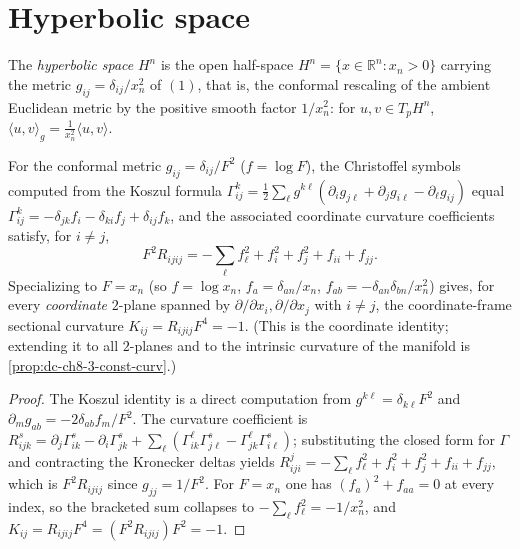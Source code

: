 \section{Hyperbolic space}

\begin{definition}
  \label{def:dc-ch8-3-hyperbolic-space}
  \leanok
  The \emph{hyperbolic space} $H^n$ is the open half-space
  $H^n=\{x\in\mathbb R^n : x_n>0\}$ carrying the metric $g_{ij}=\delta_{ij}/x_n^2$
  of $(1)$, that is, the conformal rescaling of the ambient Euclidean metric by
  the positive smooth factor $1/x_n^2$: for $u,v\in T_pH^n$,
  $\langle u,v\rangle_g=\tfrac{1}{x_n^2}\langle u,v\rangle$.
\end{definition}

\begin{lemma}
  \label{lem:dc-ch8-3-conformal-curvature}
  \leanok
  For the conformal metric $g_{ij}=\delta_{ij}/F^2$ ($f=\log F$), the Christoffel
  symbols computed from the Koszul formula
  $\Gamma^k_{ij}=\tfrac12\sum_\ell g^{k\ell}(\partial_i g_{j\ell}+\partial_j g_{i\ell}-\partial_\ell g_{ij})$
  equal $\Gamma^k_{ij}=-\delta_{jk}f_i-\delta_{ki}f_j+\delta_{ij}f_k$, and the
  associated coordinate curvature coefficients satisfy, for $i\neq j$,
  $$F^2R_{ijij}=-\sum_\ell f_\ell^2+f_i^2+f_j^2+f_{ii}+f_{jj}.$$
  Specializing to $F=x_n$ (so $f=\log x_n$, $f_a=\delta_{an}/x_n$,
  $f_{ab}=-\delta_{an}\delta_{bn}/x_n^2$) gives, for every \emph{coordinate}
  $2$-plane spanned by $\partial/\partial x_i,\partial/\partial x_j$ with $i\neq j$,
  the coordinate-frame sectional curvature $K_{ij}=R_{ijij}F^4=-1$. (This is the
  coordinate identity; extending it to all $2$-planes and to the intrinsic
  curvature of the manifold is \cref{prop:dc-ch8-3-const-curv}.)
\end{lemma}
\begin{proof}
  \leanok
\sketch
  The Koszul identity is a direct computation from
  $g^{k\ell}=\delta_{k\ell}F^2$ and $\partial_m g_{ab}=-2\delta_{ab}f_m/F^2$.
  The curvature coefficient is
  $R^s_{ijk}=\partial_j\Gamma^s_{ik}-\partial_i\Gamma^s_{jk}+\sum_\ell(\Gamma^\ell_{ik}\Gamma^s_{j\ell}-\Gamma^\ell_{jk}\Gamma^s_{i\ell})$;
  substituting the closed form for $\Gamma$ and contracting the Kronecker deltas
  yields $R^j_{iji}=-\sum_\ell f_\ell^2+f_i^2+f_j^2+f_{ii}+f_{jj}$, which is
  $F^2R_{ijij}$ since $g_{jj}=1/F^2$. For $F=x_n$ one has
  $(f_a)^2+f_{aa}=0$ at every index, so the bracketed sum collapses to
  $-\sum_\ell f_\ell^2=-1/x_n^2$, and $K_{ij}=R_{ijij}F^4=(F^2R_{ijij})F^2=-1$.
\end{proof}

